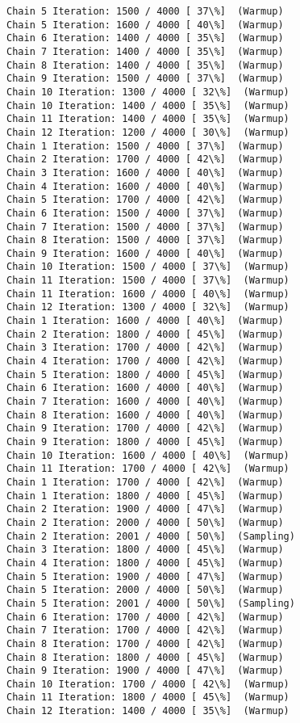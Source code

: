 \documentclass[11pt]{article}
\begin{document}
\begin{Verbatim}[commandchars=\\\{\}]
Chain 5 Iteration: 1500 / 4000 [ 37\%]  (Warmup)
Chain 5 Iteration: 1600 / 4000 [ 40\%]  (Warmup)
Chain 6 Iteration: 1400 / 4000 [ 35\%]  (Warmup)
Chain 7 Iteration: 1400 / 4000 [ 35\%]  (Warmup)
Chain 8 Iteration: 1400 / 4000 [ 35\%]  (Warmup)
Chain 9 Iteration: 1500 / 4000 [ 37\%]  (Warmup)
Chain 10 Iteration: 1300 / 4000 [ 32\%]  (Warmup)
Chain 10 Iteration: 1400 / 4000 [ 35\%]  (Warmup)
Chain 11 Iteration: 1400 / 4000 [ 35\%]  (Warmup)
Chain 12 Iteration: 1200 / 4000 [ 30\%]  (Warmup)
Chain 1 Iteration: 1500 / 4000 [ 37\%]  (Warmup)
Chain 2 Iteration: 1700 / 4000 [ 42\%]  (Warmup)
Chain 3 Iteration: 1600 / 4000 [ 40\%]  (Warmup)
Chain 4 Iteration: 1600 / 4000 [ 40\%]  (Warmup)
Chain 5 Iteration: 1700 / 4000 [ 42\%]  (Warmup)
Chain 6 Iteration: 1500 / 4000 [ 37\%]  (Warmup)
Chain 7 Iteration: 1500 / 4000 [ 37\%]  (Warmup)
Chain 8 Iteration: 1500 / 4000 [ 37\%]  (Warmup)
Chain 9 Iteration: 1600 / 4000 [ 40\%]  (Warmup)
Chain 10 Iteration: 1500 / 4000 [ 37\%]  (Warmup)
Chain 11 Iteration: 1500 / 4000 [ 37\%]  (Warmup)
Chain 11 Iteration: 1600 / 4000 [ 40\%]  (Warmup)
Chain 12 Iteration: 1300 / 4000 [ 32\%]  (Warmup)
Chain 1 Iteration: 1600 / 4000 [ 40\%]  (Warmup)
Chain 2 Iteration: 1800 / 4000 [ 45\%]  (Warmup)
Chain 3 Iteration: 1700 / 4000 [ 42\%]  (Warmup)
Chain 4 Iteration: 1700 / 4000 [ 42\%]  (Warmup)
Chain 5 Iteration: 1800 / 4000 [ 45\%]  (Warmup)
Chain 6 Iteration: 1600 / 4000 [ 40\%]  (Warmup)
Chain 7 Iteration: 1600 / 4000 [ 40\%]  (Warmup)
Chain 8 Iteration: 1600 / 4000 [ 40\%]  (Warmup)
Chain 9 Iteration: 1700 / 4000 [ 42\%]  (Warmup)
Chain 9 Iteration: 1800 / 4000 [ 45\%]  (Warmup)
Chain 10 Iteration: 1600 / 4000 [ 40\%]  (Warmup)
Chain 11 Iteration: 1700 / 4000 [ 42\%]  (Warmup)
Chain 1 Iteration: 1700 / 4000 [ 42\%]  (Warmup)
Chain 1 Iteration: 1800 / 4000 [ 45\%]  (Warmup)
Chain 2 Iteration: 1900 / 4000 [ 47\%]  (Warmup)
Chain 2 Iteration: 2000 / 4000 [ 50\%]  (Warmup)
Chain 2 Iteration: 2001 / 4000 [ 50\%]  (Sampling)
Chain 3 Iteration: 1800 / 4000 [ 45\%]  (Warmup)
Chain 4 Iteration: 1800 / 4000 [ 45\%]  (Warmup)
Chain 5 Iteration: 1900 / 4000 [ 47\%]  (Warmup)
Chain 5 Iteration: 2000 / 4000 [ 50\%]  (Warmup)
Chain 5 Iteration: 2001 / 4000 [ 50\%]  (Sampling)
Chain 6 Iteration: 1700 / 4000 [ 42\%]  (Warmup)
Chain 7 Iteration: 1700 / 4000 [ 42\%]  (Warmup)
Chain 8 Iteration: 1700 / 4000 [ 42\%]  (Warmup)
Chain 8 Iteration: 1800 / 4000 [ 45\%]  (Warmup)
Chain 9 Iteration: 1900 / 4000 [ 47\%]  (Warmup)
Chain 10 Iteration: 1700 / 4000 [ 42\%]  (Warmup)
Chain 11 Iteration: 1800 / 4000 [ 45\%]  (Warmup)
Chain 12 Iteration: 1400 / 4000 [ 35\%]  (Warmup)

\end{Verbatim}
\end{document}
